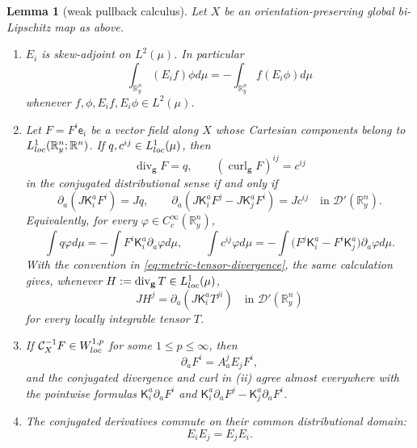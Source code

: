 \documentclass[10pt,a4paper]{amsart}
\newtheorem{lemma}{Lemma}
\DeclareMathOperator{\Div}{div}
\newcommand{\Kmat}{\mathsf K}
\newcommand{\Real}{\mathbb R}
\newcommand{\Rn}{\Real^n}
\DeclareMathOperator{\curl}{curl}
\newcommand{\eframe}{\mathsf e}   %
\newcommand{\gmetric}{\mathbf g}
\begin{document}
\begin{lemma}[weak pullback calculus]\label{lem:weak-pullback}
Let $X$ be an orientation-preserving global bi-Lipschitz map as above.
\begin{enumerate}
\item[(i)] $E_i$ is skew-adjoint on $L^2(\mu)$. In particular
  \[
   \int_{\Real_y^n}(E_if)\phi d\mu=-\int_{\Real_y^n}f(E_i\phi)d\mu
  \]
  whenever $f,\phi,E_if,E_i\phi\in L^2(\mu)$.
\item[(ii)] Let $F=F^i\eframe_i$ be a vector field along $X$ whose Cartesian components belong to $L^1_{\rm loc}(\Real^n_y;\Rn)$. If
  $q,c^{ij}\in L^1_{\rm loc}(\mu)$, then
  \[
   \Div_{\gmetric}F=q,
   \qquad
   (\curl_{\gmetric}F)^{ij}=c^{ij}
  \]
  in the conjugated distributional sense if and only if
  \[
   \partial_a(J\Kmat_i^aF^i)=Jq,
   \qquad
   \partial_a\!\left(J\Kmat_i^aF^j-J\Kmat_j^aF^i\right)=Jc^{ij}
   \quad\text{in }\mathcal D'(\Real^n_y).
  \]
  Equivalently, for every $\varphi\in C_c^\infty(\Real^n_y)$,
  \begin{equation}\label{eq:conservativeform}
   \int q\varphi d\mu=-\int F^i\Kmat_i^a\partial_a\varphi d\mu,\qquad
   \int c^{ij}\varphi d\mu=-\int\bigl(F^j\Kmat_i^a-F^i\Kmat_j^a\bigr)
          \partial_a\varphi d\mu.
  \end{equation}
  With the convention in \eqref{eq:metric-tensor-divergence}, the same
  calculation gives, whenever
  $H:=\Div_{\gmetric}T\in L^1_{\rm loc}(\mu)$,
  \begin{equation}\label{eq:conservative-tensor-divergence}
   JH^j
   =\partial_a(J\Kmat_i^aT^{ji})
   \quad\text{in }\mathcal D'(\Real_y^n)
  \end{equation}
  for every locally integrable tensor $T$.
\item[(iii)] If $\mathcal C_X^{-1}F\in W^{1,p}_{\rm loc}$ for some
  $1\le p\le\infty$, then 
  \begin{equation}\label{eq:biLipchainrule}
      \partial_aF^i=A_a^jE_jF^i,
  \end{equation}
  and the conjugated divergence and curl in
  (ii) agree almost everywhere with the pointwise formulas $\Kmat^a_i\partial_aF^i$ and
  $\Kmat^a_i\partial_aF^j-\Kmat^a_j\partial_aF^i$.
\item[(iv)] The conjugated derivatives commute on their common
distributional domain:
  \[
   E_iE_j=E_jE_i.
  \]
\end{enumerate}
\end{lemma}
\end{document}
